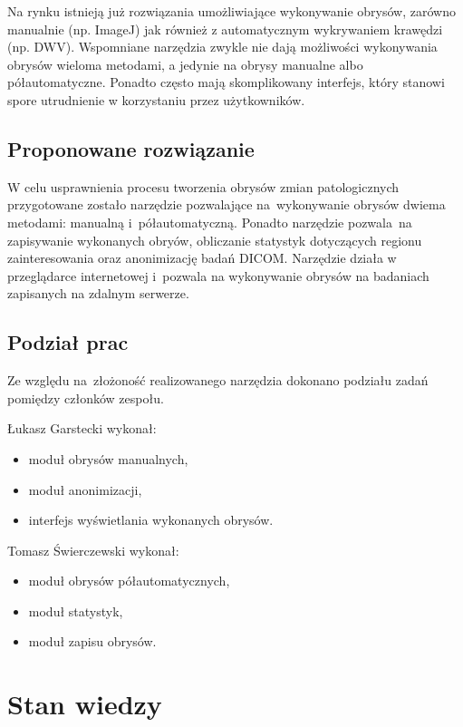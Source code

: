\documentclass[a4paper,11pt,twoside,openright]{report}
\newcommand\blankpage{%
    \null
    \thispagestyle{empty}%
    \newpage}
\theoremstyle{definition}
\begin{document}
Na rynku istnieją już rozwiązania umożliwiające wykonywanie obrysów,
zarówno manualnie (np. ImageJ) jak również z automatycznym wykrywaniem krawędzi (np. DWV).
Wspomniane narzędzia zwykle nie dają możliwości wykonywania obrysów wieloma metodami,
a jedynie na obrysy manualne albo półautomatyczne. Ponadto często mają skomplikowany
interfejs, który stanowi spore utrudnienie w korzystaniu przez użytkowników.

\section {Proponowane rozwiązanie}

W celu usprawnienia procesu tworzenia obrysów zmian patologicznych przygotowane
zostało narzędzie pozwalające na~wykonywanie obrysów dwiema metodami:
manualną i~półautomatyczną. Ponadto narzędzie pozwala~na zapisywanie wykonanych obryów,
obliczanie statystyk dotyczących regionu zainteresowania oraz anonimizację badań DICOM.
Narzędzie działa w przeglądarce internetowej i~pozwala na wykonywanie obrysów na badaniach
zapisanych na zdalnym serwerze.

\section {Podział prac}

Ze względu na~złożoność realizowanego narzędzia dokonano podziału zadań pomiędzy
członków zespołu.

Łukasz Garstecki wykonał:

\begin{itemize}[noitemsep]
	\item moduł obrysów manualnych,
	\item moduł anonimizacji,
	\item interfejs wyświetlania wykonanych obrysów.
\end{itemize}

\pagebreak

Tomasz Świerczewski wykonał:

\begin{itemize}[noitemsep]
\item moduł obrysów półautomatycznych,
\item moduł statystyk,
\item moduł zapisu obrysów.
\end{itemize}

\afterpage{\blankpage}

\chapter {Stan wiedzy}
\end{document}
